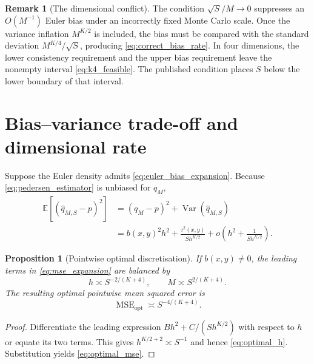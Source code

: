 \documentclass[11pt]{article}
\newtheorem{proposition}{Proposition}
\theoremstyle{definition}
\newtheorem{remark}{Remark}
\newcommand{\E}{\mathbb{E}}
\newcommand{\Var}{\operatorname{Var}}
\begin{document}
\begin{remark}[The dimensional conflict]
The condition $\sqrt S/M\to0$ suppresses an $O(M^{-1})$ Euler bias under an incorrectly fixed Monte Carlo scale. Once the variance inflation $M^{K/2}$ is included, the bias must be compared with the standard deviation $M^{K/4}/\sqrt S$, producing \eqref{eq:correct_bias_rate}. In four dimensions, the lower consistency requirement and the upper bias requirement leave the nonempty interval \eqref{eq:k4_feasible}. The published condition places $S$ below the lower boundary of that interval.
\end{remark}

\section{Bias--variance trade-off and dimensional rate}\label{sec:mse}

Suppose the Euler density admits \eqref{eq:euler_bias_expansion}. Because \eqref{eq:pedersen_estimator} is unbiased for $q_M$,
\begin{align}
\E\!\left[(\widehat q_{M,S}-p)^2\right]
&=(q_M-p)^2+\Var(\widehat q_{M,S}) \nonumber\\
&=b(x,y)^2h^2
+\frac{\tau^2(x,y)}{S h^{K/2}}
+o\!\left(h^2+\frac{1}{S h^{K/2}}\right). \label{eq:mse_expansion}
\end{align}

\begin{proposition}[Pointwise optimal discretisation]\label{prop:optimal_m}
If $b(x,y)\ne0$, the leading terms in \eqref{eq:mse_expansion} are balanced by
\begin{equation}\label{eq:optimal_h}
h\asymp S^{-2/(K+4)},
\qquad
M\asymp S^{2/(K+4)}.
\end{equation}
The resulting optimal pointwise mean squared error is
\begin{equation}\label{eq:optimal_mse}
\operatorname{MSE}_{\mathrm{opt}}
\asymp S^{-4/(K+4)}.
\end{equation}
\end{proposition}

\begin{proof}
Differentiate the leading expression $B h^2+C/(S h^{K/2})$ with respect to $h$ or equate its two terms. This gives $h^{K/2+2}\asymp S^{-1}$ and hence \eqref{eq:optimal_h}. Substitution yields \eqref{eq:optimal_mse}.
\end{proof}
\end{document}
